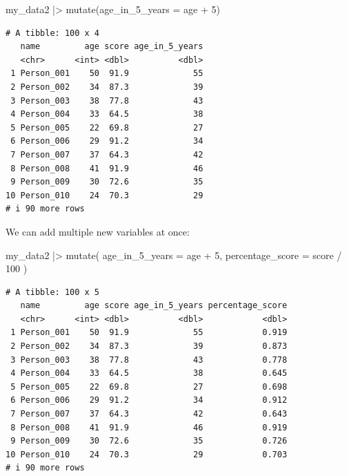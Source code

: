 \documentclass[
  letterpaper,
  8pt,
  a4paper]{book}
\newenvironment{Shaded}{\begin{snugshade}}{\end{snugshade}}
\newcommand{\AttributeTok}[1]{\textcolor[rgb]{0.40,0.45,0.13}{#1}}
\newcommand{\DecValTok}[1]{\textcolor[rgb]{0.68,0.00,0.00}{#1}}
\newcommand{\FunctionTok}[1]{\textcolor[rgb]{0.28,0.35,0.67}{#1}}
\newcommand{\NormalTok}[1]{\textcolor[rgb]{0.00,0.23,0.31}{#1}}
\newcommand{\SpecialCharTok}[1]{\textcolor[rgb]{0.37,0.37,0.37}{#1}}
\begin{document}
\begin{Shaded}
\begin{Highlighting}[]
\NormalTok{my\_data2 }\SpecialCharTok{|\textgreater{}} 
  \FunctionTok{mutate}\NormalTok{(}\AttributeTok{age\_in\_5\_years =}\NormalTok{ age }\SpecialCharTok{+} \DecValTok{5}\NormalTok{)}
\end{Highlighting}
\end{Shaded}

\begin{verbatim}
# A tibble: 100 x 4
   name         age score age_in_5_years
   <chr>      <int> <dbl>          <dbl>
 1 Person_001    50  91.9             55
 2 Person_002    34  87.3             39
 3 Person_003    38  77.8             43
 4 Person_004    33  64.5             38
 5 Person_005    22  69.8             27
 6 Person_006    29  91.2             34
 7 Person_007    37  64.3             42
 8 Person_008    41  91.9             46
 9 Person_009    30  72.6             35
10 Person_010    24  70.3             29
# i 90 more rows
\end{verbatim}

We can add multiple new variables at once:

\begin{Shaded}
\begin{Highlighting}[]
\NormalTok{my\_data2 }\SpecialCharTok{|\textgreater{}} 
  \FunctionTok{mutate}\NormalTok{(}
    \AttributeTok{age\_in\_5\_years =}\NormalTok{ age }\SpecialCharTok{+} \DecValTok{5}\NormalTok{,}
    \AttributeTok{percentage\_score =}\NormalTok{ score }\SpecialCharTok{/} \DecValTok{100}
\NormalTok{  )}
\end{Highlighting}
\end{Shaded}

\begin{verbatim}
# A tibble: 100 x 5
   name         age score age_in_5_years percentage_score
   <chr>      <int> <dbl>          <dbl>            <dbl>
 1 Person_001    50  91.9             55            0.919
 2 Person_002    34  87.3             39            0.873
 3 Person_003    38  77.8             43            0.778
 4 Person_004    33  64.5             38            0.645
 5 Person_005    22  69.8             27            0.698
 6 Person_006    29  91.2             34            0.912
 7 Person_007    37  64.3             42            0.643
 8 Person_008    41  91.9             46            0.919
 9 Person_009    30  72.6             35            0.726
10 Person_010    24  70.3             29            0.703
# i 90 more rows
\end{verbatim}
\end{document}
